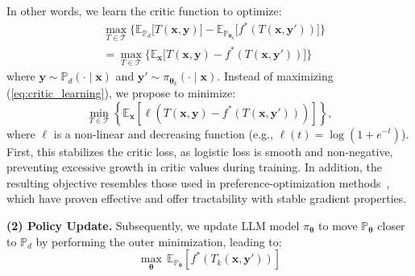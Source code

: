 In other words, we learn the critic function to optimize:
\begin{equation}
\label{eq:critic_learning}
\begin{split}
&\max_{T\in\mathcal{T}} \Big\{ \mathbb{E}_{\mathbb{P}_{d}}\big[T(\boldsymbol{x},\boldsymbol{y})\big] - \mathbb{E}_{\mathbb{P}_{\boldsymbol{\theta}_{k}}}\big[f^{*}(T(\boldsymbol{x},\boldsymbol{y}'))\big] \Big\} \\
& = \max_{T\in\mathcal{T}} \Big\{ \mathbb{E}_{\boldsymbol{x}}\big[T(\boldsymbol{x},\boldsymbol{y})-f^{*}(T(\boldsymbol{x},\boldsymbol{y}'))\big] \Big\}
\end{split}
\end{equation}
where $\boldsymbol{y} \sim \mathbb{P}_d(\cdot\mid \boldsymbol{x})$ and $\boldsymbol{y}' \sim \pi_{\boldsymbol{\theta}_k}(\cdot\mid \boldsymbol{x})$. Instead of maximizing (\ref{eq:critic_learning}), we propose to minimize:
\begin{equation}
\min_{T\in\mathcal{T}}\left\{ \mathbb{E}_{\boldsymbol{x}}\left[\ell\left(T\left(\boldsymbol{x},\boldsymbol{y}\right)-f^{*}\left(T\left(\boldsymbol{x},\boldsymbol{y}'\right)\right)\right)\right]\right\},\label{eq:critic_learning_general}
\end{equation}
where $\ell$ is a non-linear and decreasing function (e.g., $\ell(t) = \log(1 + e^{-t})$).
First, this stabilizes the critic loss, as logistic loss is smooth and non-negative, preventing excessive growth in critic values during training. In addition, the resulting objective resembles those used in preference-optimization methods~\citep{rafailov2024directpreferenceoptimizationlanguage, chen2024self}, which have proven effective and offer tractability with stable gradient properties.

\noindent\textbf{(2) Policy Update.} Subsequently, we update LLM model $\pi_{\boldsymbol{\theta}}$ to move $\mathbb{P}_{\boldsymbol{\theta}}$ closer to $\mathbb{P}_d$ by performing the outer minimization, leading to:
\begin{equation}
\max_{\boldsymbol{\theta}}\,\mathbb{E}_{\mathbb{P}_{\boldsymbol{\theta}}}\left[f^{*}\left(T_{k}\left(\boldsymbol{x},\boldsymbol{y}'\right)\right)\right]
\label{eq:update_theta}
\end{equation}


